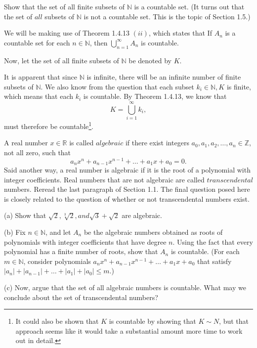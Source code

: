\documentclass[12pt]{article}
\newcommand{\N}{\mathbb{N}}
\newcommand{\Z}{\mathbb{Z}}
\newcommand{\R}{\mathbb{R}}
\newenvironment{exercise}[2][Exercise]{\begin{trivlist}
\item[\hskip \labelsep {\bfseries #1}\hskip \labelsep {\bfseries #2.}]}{\end{trivlist}}
\begin{document}
\begin{exercise}{1.4.10}
Show that the set of all finite subsets of $\N$ is a countable set. (It turns out that the set of $all$ subsets of $\N$ is not a countable set. This is the topic of Section 1.5.)
\end{exercise}

We will be making use of Theorem 1.4.13 $(ii)$, which states that If $A_n$ is a countable set for each $n \in \N$, then $\bigcup_{n=1}^{\infty}A_n$ is countable. 

Now, let the set of all finite subsets of $\N$ be denoted by $K$.

\noindent It is apparent that since $\N$ is infinite, there will be an infinite number of finite subsets of $\N$. We also know from the question that each subset $k_i \in \N, K$ is finite, which means that each $k_i$ is countable. By Theorem 1.4.13, we know that
$$K = \bigcup_{i=1}^{\infty}k_i,$$
must therefore be countable\footnote{It could also be shown that $K$ is countable by showing that $K \sim N$, but that approach seems like it would take a substantial amount more time to work out in detail.}.

\begin{exercise}{1.4.12}
A real number $x \in{\R}$ is called $\textit{algebraic}$ if there exist integers $a_0, a_1, a_2, \ldots, a_n \in \Z$, not all zero, such that $$a_n x^n + a_{n-1}x^{n-1} + \ldots + a_1x + a_0 = 0.$$ Said another way, a real number is algebraic if it is the root of a polynomial with integer coefficients. Real numbers that are not algebraic are called $\textit{transcendental}$ numbers. Reread the last paragraph of Section 1.1. The final question posed here is closely related to the question of whether or not transcendental numbers exist.

(a) Show that $\sqrt{2}, \sqrt[3]{2}, and \sqrt{3} + \sqrt{2}$ are algebraic.

(b) Fix $n \in \N$, and let $A_n$ be the algebraic numbers obtained as roots of polynomials with integer coefficients that have degree $n$. Using the fact that every polynomial has a finite number of roots, show that $A_n$ is countable. (For each $m \in \N$, consider polynomials $a_nx^n + a_{n-1}x^{n-1} + \ldots + a_1x + a_0$ that satisfy $|a_n|+|a_{n−1}|+\ldots+|a_1|+|a_0|\leq m$.)

(c) Now, argue that the set of all algebraic numbers is countable. What may we conclude about the set of transcendental numbers? 
\end{exercise}
\end{document}

